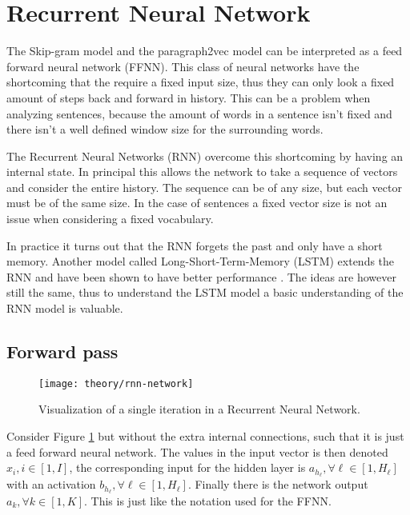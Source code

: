 
\section{Recurrent Neural Network}

The Skip-gram model and the paragraph2vec model can be interpreted as a feed forward neural network (FFNN). This class of neural networks have the shortcoming that the require a fixed input size, thus they can only look a fixed amount of steps back and forward in history. This can be a problem when analyzing sentences, because the amount of words in a sentence isn't fixed and there isn't a well defined window size for the surrounding words.

The Recurrent Neural Networks (RNN) overcome this shortcoming by having an internal state. In principal this allows the network to take a sequence of vectors and consider the entire history. The sequence can be of any size, but each vector must be of the same size. In the case of sentences a fixed vector size is not an issue when considering a fixed vocabulary.

In practice it turns out that the RNN forgets the past and only have a short memory. Another model called Long-Short-Term-Memory (LSTM) extends the RNN and have been shown to have better performance \cite{alexgraves}. The ideas are however still the same, thus to understand the LSTM model a basic understanding of the RNN model is valuable.

\subsection{Forward pass}

\begin{figure}[h]
	\centering
	\texttt{[image: theory/rnn-network]}
	\caption{Visualization of a single iteration in a Recurrent Neural Network.}
	\label{fig:theory:rnn:rnn-network}
\end{figure}

Consider Figure \ref{fig:theory:rnn:rnn-network} but without the extra internal connections, such that it is just a feed forward neural network. The values in the input vector is then denoted $x_{i}, i \in [1, I]$, the corresponding input for the hidden layer is $a_{h_\ell}, \forall \ell \in [1, H_\ell]$ with an activation $b_{h_\ell}, \forall \ell \in [1, H_\ell]$. Finally there is the network output $a_{k}, \forall k \in [1, K]$. This is just like the notation used for the FFNN.

